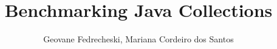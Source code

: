 \title{Benchmarking Java Collections}
\author{Geovane Fedrecheski, Mariana Cordeiro dos Santos}

\address{Departamento de Ciência da Computação \\
Universidade Estadual do Centro-Oeste (UNICENTRO)\\
Rua Padre Salvador, 875 -- CEP 85015-430\\
Guarapuava -- PR -- Brasil -- Phone: (42) 3621-1000\\
}


